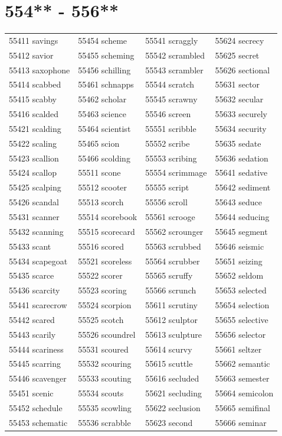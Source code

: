\documentclass[10pt, oneside]{book}
\begin{document}
\begin{table}
	\centering
	\section*{554** - 556**}
	\begin{tabular}{l l l l}
55411 savings &55454 scheme &55541 scraggly &55624 secrecy\\
55412 savior &55455 scheming &55542 scrambled &55625 secret\\
55413 saxophone &55456 schilling &55543 scrambler &55626 sectional\\
55414 scabbed &55461 schnapps &55544 scratch &55631 sector\\
55415 scabby &55462 scholar &55545 scrawny &55632 secular\\
55416 scalded &55463 science &55546 screen &55633 securely\\
55421 scalding &55464 scientist &55551 scribble &55634 security\\
55422 scaling &55465 scion &55552 scribe &55635 sedate\\
55423 scallion &55466 scolding &55553 scribing &55636 sedation\\
55424 scallop &55511 scone &55554 scrimmage &55641 sedative\\
55425 scalping &55512 scooter &55555 script &55642 sediment\\
55426 scandal &55513 scorch &55556 scroll &55643 seduce\\
55431 scanner &55514 scorebook &55561 scrooge &55644 seducing\\
55432 scanning &55515 scorecard &55562 scrounger &55645 segment\\
55433 scant &55516 scored &55563 scrubbed &55646 seismic\\
55434 scapegoat &55521 scoreless &55564 scrubber &55651 seizing\\
55435 scarce &55522 scorer &55565 scruffy &55652 seldom\\
55436 scarcity &55523 scoring &55566 scrunch &55653 selected\\
55441 scarecrow &55524 scorpion &55611 scrutiny &55654 selection\\
55442 scared &55525 scotch &55612 sculptor &55655 selective\\
55443 scarily &55526 scoundrel &55613 sculpture &55656 selector\\
55444 scariness &55531 scoured &55614 scurvy &55661 seltzer\\
55445 scarring &55532 scouring &55615 scuttle &55662 semantic\\
55446 scavenger &55533 scouting &55616 secluded &55663 semester\\
55451 scenic &55534 scouts &55621 secluding &55664 semicolon\\
55452 schedule &55535 scowling &55622 seclusion &55665 semifinal\\
55453 schematic &55536 scrabble &55623 second &55666 seminar\\
	\end{tabular}
 \end{table}
\clearpage
\end{document}
